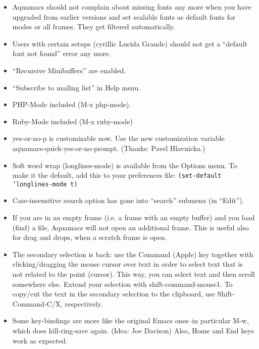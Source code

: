 \begin{itemize}

\item Aquamacs should not complain about missing fonts any more when
    you have upgraded from earlier versions and set scalable fonts as
    default fonts for modes or all frames. They get filtered  automatically.

\item Users with certain setups (cyrillic Lucida Grande) should not get
    a ``default font not found'' error any more.


\item ``Recursive Minibuffers'' are enabled.

\item ``Subscribe to mailing list'' in Help menu.

\item PHP-Mode included (M-x php-mode).

\item Ruby-Mode included (M-x ruby-mode)

\item yes-or-no-p is customizable now. Use the new customization
        variable aquamacs-quick-yes-or-no-prompt. (Thanks: Pavel Hlavnicka.)

\item Soft word wrap (longlines-mode) is available from the Options
        menu. To make it the default, add this to your preferences
        file:
        \texttt{(set-default 'longlines-mode t)}

\item Case-insensitive search option has gone into ``search'' submenu (in ``Edit'').

\item If you are in an empty frame (i.e. a frame with an empty buffer)
        and you load (find) a file, Aquamacs will not open an additional frame.
        This is useful also for drag and drops, when a scratch frame is open.

\item The secondary selection is back: use the Command (Apple) key
    together with clicking/dragging the mouse cursor over text in
    order to select text that is not related to the point
    (cursor). This way, you can select text and then scroll somewhere
    else. Extend your selection with shift-command-mouse1.
    To copy/cut the text in the secondary selection to the  clipboard, use
    Shift-Command-C/X, respectively.

\item Some key-bindings are more like the original Emacs ones--in
    particular M-w, which does kill-ring-save again.
    (Idea: Joe Davison)   Also, Home and End keys work as expected.


\end{itemize}
